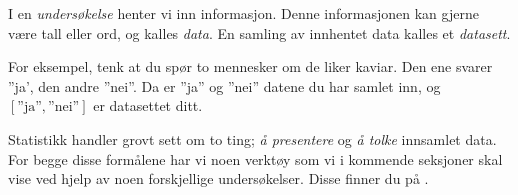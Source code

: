 



I en \textit{undersøkelse} henter vi inn informasjon. Denne informasjonen kan gjerne være tall eller ord, og kalles \textit{data}. En samling av innhentet data kalles et \textit{datasett}. \vsk

For eksempel, tenk at du spør to mennesker om de liker kaviar. Den ene svarer ''ja', den andre ''nei''. Da er ''ja'' og ''nei'' datene du har samlet inn, og $ [\text{''ja''}, \text{''nei''}] $ er datasettet ditt. \vsk

Statistikk handler grovt sett om to ting;  \textsl{å presentere} og \textsl{å tolke} innsamlet data. For begge disse formålene har vi noen verktøy som vi i kommende seksjoner skal vise ved hjelp av noen forskjellige undersøkelser. Disse finner du på \pageref{undersok}. \vsk

